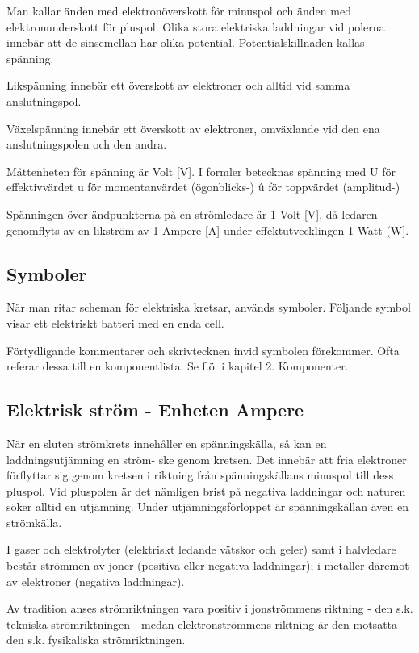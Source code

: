 \documentclass[a4paper,twoside,twocolumn,openright]{book}
\begin{document}
Man kallar änden med elektronöverskott för minuspol och änden med elektronunderskott för
pluspol. Olika stora elektriska laddningar vid polerna innebär att de sinsemellan har
olika potential. Potentialskillnaden kallas spänning.

Likspänning innebär ett överskott av elektroner och alltid vid samma
anslutningspol.

Växelspänning innebär ett överskott av elektroner, omväxlande vid den ena
anslutningspolen och den andra.

Måttenheten för spänning är Volt [V].
I formler betecknas spänning med
U för effektivvärdet
u för momentanvärdet (ögonblicks-)
û för toppvärdet (amplitud-)

Spänningen över ändpunkterna på en
strömledare är 1 Volt [V], då ledaren
genomflyts av en likström av 1 Ampere
[A] under effektutvecklingen 1 Watt (W].

\subsection{Symboler}

När man ritar scheman för elektriska kretsar, används symboler. Följande symbol visar
ett elektriskt batteri med en enda cell.

Förtydligande kommentarer och skrivtecknen invid symbolen förekommer. Ofta
referar dessa till en komponentlista. Se f.ö. i kapitel 2. Komponenter.

\subsection{Elektrisk ström - Enheten Ampere}

När en sluten strömkrets innehåller en spänningskälla, så kan en laddningsutjämning en
ström- ske genom kretsen. Det innebär att fria elektroner förflyttar sig genom kretsen i
riktning från spänningskällans minuspol till dess pluspol. Vid pluspolen är det nämligen
brist på negativa laddningar och naturen söker alltid en utjämning. Under
utjämningsförloppet är spänningskällan även en strömkälla.

I gaser och elektrolyter (elektriskt ledande vätskor och geler) samt i halvledare består
strömmen av joner (positiva eller negativa laddningar); i metaller däremot av elektroner
(negativa laddningar).

Av tradition anses strömriktningen vara positiv i jonströmmens riktning - den s.k.
tekniska strömriktningen - medan elektronströmmens riktning är den motsatta - den
s.k. fysikaliska strömriktningen.
\end{document}

